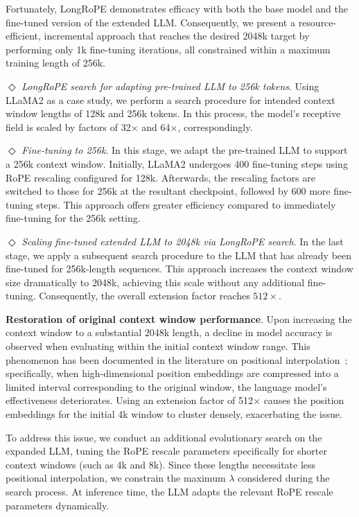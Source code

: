 Fortunately, LongRoPE demonstrates efficacy with both the base model and the fine-tuned version of the extended LLM. Consequently, we present a resource-efficient, incremental approach that reaches the desired 2048k target by performing only 1k fine-tuning iterations, all constrained within a maximum training length of 256k.

$\Diamond$ \textit{LongRoPE search for adapting pre-trained LLM to 256k tokens}. Using LLaMA2 as a case study, we perform a search procedure for intended context window lengths of 128k and 256k tokens. In this process, the model’s receptive field is scaled by factors of 32$\times$ and 64$\times$, correspondingly.

$\Diamond$ \textit{Fine-tuning to 256k}. In this stage, we adapt the pre-trained LLM to support a 256k context window. Initially, LLaMA2 undergoes 400 fine-tuning steps using RoPE rescaling configured for 128k. Afterwards, the rescaling factors are switched to those for 256k at the resultant checkpoint, followed by 600 more fine-tuning steps. This approach offers greater efficiency compared to immediately fine-tuning for the 256k setting.

$\Diamond$ \textit{Scaling fine-tuned extended LLM to 2048k via LongRoPE search}. In the last stage, we apply a subsequent search procedure to the LLM that has already been fine-tuned for 256k-length sequences. This approach increases the context window size dramatically to 2048k, achieving this scale without any additional fine-tuning. Consequently, the overall extension factor reaches $512\times$.

\textbf{Restoration of original context window performance}.  Upon increasing the context window to a substantial 2048k length, a decline in model accuracy is observed when evaluating within the initial context window range. This phenomenon has been documented in the literature on positional interpolation~\cite{pi}; specifically, when high-dimensional position embeddings are compressed into a limited interval corresponding to the original window, the language model's effectiveness deteriorates. Using an extension factor of 512$\times$ causes the position embeddings for the initial 4k window to cluster densely, exacerbating the issue.

To address this issue, we conduct an additional evolutionary search on the expanded LLM, tuning the RoPE rescale parameters specifically for shorter context windows (such as 4k and 8k). Since these lengths necessitate less positional interpolation, we constrain the maximum $\lambda$ considered during the search process. At inference time, the LLM adapts the relevant RoPE rescale parameters dynamically.

